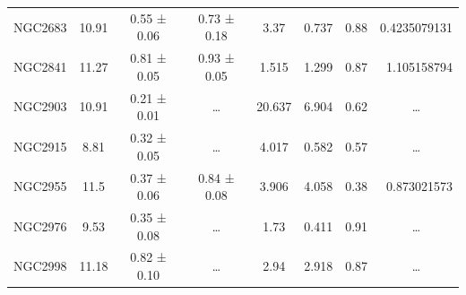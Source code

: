 \documentclass[reprint,%
 amsmath,amssymb,
 aps,
]{revtex4-1}
\begin{document}
\begin{table}[]
\begin{tabular}{cccccrrc}
\rowcolor[HTML]{F3F3F3} 
NGC2683              & 10.91                     & 0.55 ± 0.06           & 0.73 ± 0.18            & 3.37                                                         & 0.737                                                          & 0.88                                                          & \multicolumn{1}{r}{\cellcolor[HTML]{F3F3F3}0.4235079131}      \\
\rowcolor[HTML]{F3F3F3} 
NGC2841              & 11.27                     & 0.81 ± 0.05           & 0.93 ± 0.05            & 1.515                                                        & 1.299                                                            & 0.87                                                          & \multicolumn{1}{r}{\cellcolor[HTML]{F3F3F3}1.105158794}       \\
\rowcolor[HTML]{F3F3F3} 
NGC2903              & 10.91                     & 0.21 ± 0.01           & …                      & 20.637                                                       & 6.904                                                          & 0.62                                                           & …                                                             \\
\rowcolor[HTML]{F3F3F3} 
NGC2915              & 8.81                      & 0.32 ± 0.05           & …                      & 4.017                                                        & 0.582                                                          & 0.57                                                          & …                                                             \\
\rowcolor[HTML]{F3F3F3} 
NGC2955              & 11.5                      & 0.37 ± 0.06           & 0.84 ± 0.08            & 3.906                                                        & 4.058                                                             & 0.38                                                           & \multicolumn{1}{r}{\cellcolor[HTML]{F3F3F3}0.873021573}       \\
\rowcolor[HTML]{F3F3F3} 
NGC2976              & 9.53                      & 0.35 ± 0.08           & …                      & 1.73                                                         & 0.411                                                          & 0.91                                                          & …                                                             \\
\rowcolor[HTML]{F3F3F3} 
NGC2998              & 11.18                     & 0.82 ± 0.10           & …                      & 2.94                                                         & 2.918                                                         & 0.87                                                          & …                                                             \\

\end{tabular}
\end{table}
\end{document}
